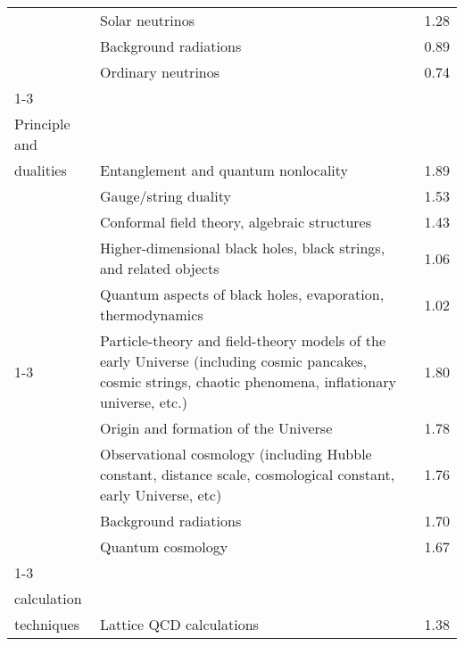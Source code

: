 \begin{longtable}[H]{p{}|p{}|p{}}
                                                               & Solar neutrinos &  1.28 \\
                                                               & Background radiations &  0.89 \\
                                                               & Ordinary neutrinos &  0.74 \\
\cline{1-3}
\multirow{5}{*}{\begin{tabular}{l}Holographic\\ Principle and\\ dualities\end{tabular}} & Entanglement and quantum nonlocality &  1.89 \\
                                                               & Gauge/string duality &  1.53 \\
                                                               & Conformal field theory, algebraic structures &  1.43 \\
                                                               & Higher-dimensional black holes, black strings, and related objects &  1.06 \\
                                                               & Quantum aspects of black holes, evaporation, thermodynamics &  1.02 \\
\cline{1-3}
\multirow{5}{*}{\begin{tabular}{l}Inflation\end{tabular}} & Particle-theory and field-theory models of the early Universe (including cosmic pancakes, cosmic strings, chaotic phenomena, inflationary universe, etc.) &  1.80 \\
                                                               & Origin and formation of the Universe &  1.78 \\
                                                               & Observational cosmology (including Hubble constant, distance scale, cosmological constant, early Universe, etc) &  1.76 \\
                                                               & Background radiations &  1.70 \\
                                                               & Quantum cosmology &  1.67 \\
\cline{1-3}
\multirow{5}{*}{\begin{tabular}{l}Lattice\\ calculation\\ techniques\end{tabular}} & Lattice QCD calculations &  1.38 \\

\end{longtable}
